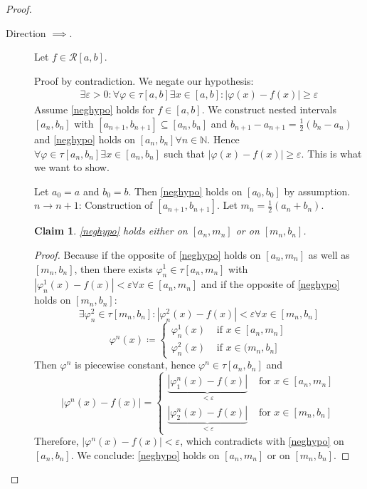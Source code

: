 \documentclass{article}
\newtheorem*{claim}{Claim}%
\newcommand{\card}[1]{\left|#1\right|}
\begin{document}
\begin{proof}\hfill{}
  \begin{description}
    \item[Direction $\implies$.] 
      Let $f \in \mathcal R[a,b]$.

      Proof by contradiction. We negate our hypothesis:
      \begin{align}
        \exists \varepsilon > 0: \forall \varphi \in \tau[a,b] \exists x \in [a,b]: \card{\varphi(x) - f(x)} \geq \varepsilon
        \label{neghypo}
      \end{align}
      Assume \eqref{neghypo} holds for $f \in [a,b]$.
      We construct nested intervals $[a_n, b_n]$ with $[a_{n+1}, b_{n+1}] \subseteq [a_n, b_n]$
      and $b_{n+1} - a_{n+1} = \frac12 (b_n - a_n)$ and \eqref{neghypo} holds on $[a_n, b_n] \forall n \in \mathbb N$.
      Hence $\forall \varphi \in \tau[a_n, b_n] \exists x \in [a_n, b_n]$ such that $\card{\varphi(x) - f(x)} \geq \varepsilon$.
      This is what we want to show.

      Let $a_0 = a$ and $b_0 = b$. Then \eqref{neghypo} holds on $[a_0, b_0]$ by assumption.
      $n \to n+1$: Construction of $[a_{n+1}, b_{n+1}]$. Let $m_n = \frac12(a_n + b_n)$.

      \begin{claim}
        \eqref{neghypo} holds either on $[a_n, m_n]$ or on $[m_n, b_n]$.
      \end{claim}

      \begin{proof}
        Because if the opposite of \eqref{neghypo} holds on $[a_n, m_n]$ as well as $[m_n, b_n]$,
        then there exists $\varphi_n^1 \in \tau[a_n, m_n]$ with $\card{\varphi_n^1(x) - f(x)} < \varepsilon \forall x \in [a_n, m_n]$
        and if the opposite of \eqref{neghypo} holds on $[m_n, b_n]$:
        \[ \exists \varphi_n^2 \in \tau[m_n, b_n]: \card{\varphi_n^2(x) - f(x)} < \varepsilon \forall x \in [m_n, b_n] \]
        \[
          \varphi^n(x) \coloneqq \begin{cases}
            \varphi_n^1(x) & \text{ if } x \in [a_n, m_n] \\
            \varphi_n^2(x) & \text{ if } x \in (m_n, b_n]
          \end{cases}
        \]
        Then $\varphi^n$ is piecewise constant, hence $\varphi^n \in \tau[a_n, b_n]$ and
        \[
          \card{\varphi^n(x) - f(x)} = \begin{cases}
            \underbrace{\card{\varphi_1^n(x) - f(x)}}_{< \varepsilon}  & \text{ for } x \in [a_n, m_n] \\
            \underbrace{\card{\varphi_2^n(x) - f(x)}}_{< \varepsilon}  & \text{ for } x \in [m_n, b_n]
          \end{cases}
        \]
        Therefore, $\card{\varphi^n(x) - f(x)} < \varepsilon$, which contradicts with \eqref{neghypo} on $[a_n, b_n]$.
        We conclude: \eqref{neghypo} holds on $[a_n, m_n]$ or on $[m_n, b_n]$.
      \end{proof}


\end{description}
\end{proof}
\end{document}
